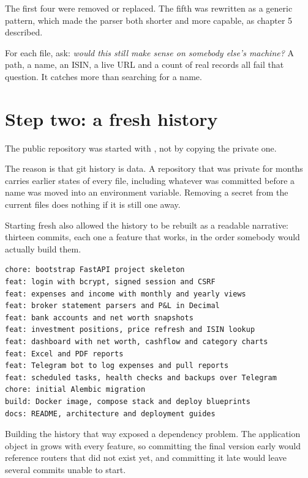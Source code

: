 The first four were removed or replaced. The fifth was rewritten as a generic
pattern, which made the parser both shorter and more capable, as chapter 5
described.

\begin{keypoint}
For each file, ask: \emph{would this still make sense on somebody else's
machine?} A path, a name, an ISIN, a live URL and a count of real records all
fail that question. It catches more than searching for a name.
\end{keypoint}

\section{Step two: a fresh history}

The public repository was started with , not by copying the
private one.

The reason is that git history is data. A repository that was private for months
carries earlier states of every file, including whatever was committed before a
name was moved into an environment variable. Removing a secret from the current
files does nothing if it is still one  away.

Starting fresh also allowed the history to be rebuilt as a readable narrative:
thirteen commits, each one a feature that works, in the order somebody would
actually build them.

\begin{lstlisting}[style=sh]
chore: bootstrap FastAPI project skeleton
feat: login with bcrypt, signed session and CSRF
feat: expenses and income with monthly and yearly views
feat: broker statement parsers and P&L in Decimal
feat: bank accounts and net worth snapshots
feat: investment positions, price refresh and ISIN lookup
feat: dashboard with net worth, cashflow and category charts
feat: Excel and PDF reports
feat: Telegram bot to log expenses and pull reports
feat: scheduled tasks, health checks and backups over Telegram
chore: initial Alembic migration
build: Docker image, compose stack and deploy blueprints
docs: README, architecture and deployment guides
\end{lstlisting}

Building the history that way exposed a dependency problem. The application
object in  grows with every feature, so committing the final
version early would reference routers that did not exist yet, and committing it
late would leave several commits unable to start.

